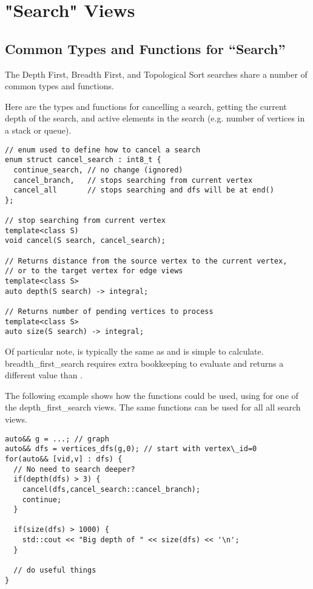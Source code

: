 \section{"Search" Views}

\subsection{Common Types and Functions for ``Search'' }

The Depth First, Breadth First, and Topological Sort searches share a number of common types and functions. 

Here are the types and functions for cancelling a search, getting the current depth of the search, and active elements in the search (e.g. number of vertices in a stack or queue).
\begin{lstlisting}
// enum used to define how to cancel a search
enum struct cancel_search : int8_t { 
  continue_search, // no change (ignored)
  cancel_branch,   // stops searching from current vertex
  cancel_all       // stops searching and dfs will be at end()
};

// stop searching from current vertex
template<class S)
void cancel(S search, cancel_search);

// Returns distance from the source vertex to the current vertex, 
// or to the target vertex for edge views
template<class S>
auto depth(S search) -> integral;

// Returns number of pending vertices to process
template<class S>
auto size(S search) -> integral; 
\end{lstlisting}

Of particular note,  is typically the same as  and is simple to calculate. breadth\_first\_search requires extra bookkeeping to evaluate  and returns a different value than .

The following example shows how the functions  could be used, using  for one of the depth\_first\_search views. The same functions can be used for all all search views.
\begin{lstlisting}
auto&& g = ...; // graph
auto&& dfs = vertices_dfs(g,0); // start with vertex\_id=0
for(auto&& [vid,v] : dfs) {
  // No need to search deeper?
  if(depth(dfs) > 3) {
    cancel(dfs,cancel_search::cancel_branch);
    continue;
  }
  
  if(size(dfs) > 1000) {
    std::cout << "Big depth of " << size(dfs) << '\n';
  }
  
  // do useful things
}
\end{lstlisting}

